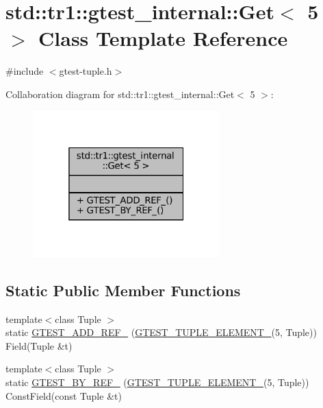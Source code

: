 \hypertarget{classstd_1_1tr1_1_1gtest__internal_1_1Get_3_015_01_4}{}\section{std\+:\+:tr1\+:\+:gtest\+\_\+internal\+:\+:Get$<$ 5 $>$ Class Template Reference}
\label{classstd_1_1tr1_1_1gtest__internal_1_1Get_3_015_01_4}


{\ttfamily \#include $<$gtest-\/tuple.\+h$>$}



Collaboration diagram for std\+:\+:tr1\+:\+:gtest\+\_\+internal\+:\+:Get$<$ 5 $>$\+:
\nopagebreak
\begin{figure}[H]
\begin{center}
\leavevmode
\includegraphics[width=205pt]{classstd_1_1tr1_1_1gtest__internal_1_1Get_3_015_01_4__coll__graph}
\end{center}
\end{figure}
\subsection*{Static Public Member Functions}
\begin{DoxyCompactItemize}
\item 
{\footnotesize template$<$class Tuple $>$ }\\static \hyperlink{classstd_1_1tr1_1_1gtest__internal_1_1Get_3_015_01_4_a0a337088bab3f824f67d1607229fdcc2}{G\+T\+E\+S\+T\+\_\+\+A\+D\+D\+\_\+\+R\+E\+F\+\_\+} (\hyperlink{gtest-tuple_8h_a1b7f133d8aa02e0b7afed7b66781eeb7}{G\+T\+E\+S\+T\+\_\+\+T\+U\+P\+L\+E\+\_\+\+E\+L\+E\+M\+E\+N\+T\+\_\+}(5, Tuple)) Field(Tuple \&t)
\item 
{\footnotesize template$<$class Tuple $>$ }\\static \hyperlink{classstd_1_1tr1_1_1gtest__internal_1_1Get_3_015_01_4_ae10fe16450db82d69b9a4d0b149ca75d}{G\+T\+E\+S\+T\+\_\+\+B\+Y\+\_\+\+R\+E\+F\+\_\+} (\hyperlink{gtest-tuple_8h_a1b7f133d8aa02e0b7afed7b66781eeb7}{G\+T\+E\+S\+T\+\_\+\+T\+U\+P\+L\+E\+\_\+\+E\+L\+E\+M\+E\+N\+T\+\_\+}(5, Tuple)) Const\+Field(const Tuple \&t)
\end{DoxyCompactItemize}


